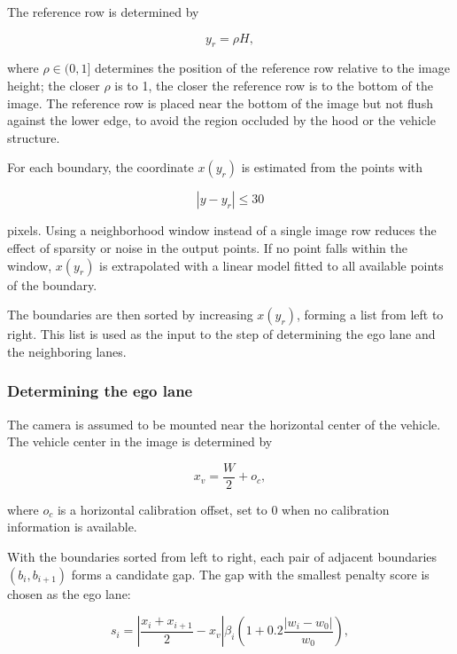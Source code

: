 \documentclass[12pt,a4paper]{report}
\begin{document}
The reference row is determined by

\begin{equation}
y_r=\rho H,
\label{eq:3.5}
\end{equation}

where $\rho\in(0,1]$ determines the position of the reference row relative to the image height; the closer $\rho$ is to 1, the closer the reference row is to the bottom of the image. The reference row is placed near the bottom of the image but not flush against the lower edge, to avoid the region occluded by the hood or the vehicle structure.

For each boundary, the coordinate $x(y_r)$ is estimated from the points with

\begin{equation}
|y-y_r|\leq30
\label{eq:3.6}
\end{equation}

pixels. Using a neighborhood window instead of a single image row reduces the effect of sparsity or noise in the output points. If no point falls within the window, $x(y_r)$ is extrapolated with a linear model fitted to all available points of the boundary.

The boundaries are then sorted by increasing $x(y_r)$, forming a list from left to right. This list is used as the input to the step of determining the ego lane and the neighboring lanes.

\subsubsection*{Determining the ego lane}

The camera is assumed to be mounted near the horizontal center of the vehicle. The vehicle center in the image is determined by

\begin{equation}
x_v=\frac{W}{2}+o_c,
\label{eq:3.7}
\end{equation}

where $o_c$ is a horizontal calibration offset, set to 0 when no calibration information is available.

With the boundaries sorted from left to right, each pair of adjacent boundaries $(b_i,b_{i+1})$ forms a candidate gap. The gap with the smallest penalty score is chosen as the ego lane:

\begin{equation}
s_i=
\left|
\frac{x_i+x_{i+1}}{2}-x_v
\right|
\beta_i
\left(
1+0.2\frac{|w_i-w_0|}{w_0}
\right),
\label{eq:3.8}
\end{equation}
\end{document}
